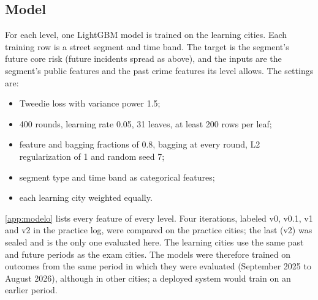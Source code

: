 \documentclass[preprint,12pt,authoryear]{elsarticle}
\begin{document}
\subsection{Model}
For each level, one LightGBM model \citep{ke2017lightgbm} is trained on the learning cities. Each training row is a street segment and time band. The target is the segment's future core risk (future incidents spread as above), and the inputs are the segment's public features and the past crime features its level allows. The settings are:
\begin{itemize}
  \item Tweedie loss with variance power 1.5;
  \item 400 rounds, learning rate 0.05, 31 leaves, at least 200 rows per leaf;
  \item feature and bagging fractions of 0.8, bagging at every round, L2 regularization of 1 and random seed 7;
  \item segment type and time band as categorical features;
  \item each learning city weighted equally.
\end{itemize}
\ref{app:modelo} lists every feature of every level. Four iterations, labeled v0, v0.1, v1 and v2 in the practice log, were compared on the practice cities; the last (v2) was sealed and is the only one evaluated here. The learning cities use the same past and future periods as the exam cities. The models were therefore trained on outcomes from the same period in which they were evaluated (September 2025 to August 2026), although in other cities; a deployed system would train on an earlier period.
\end{document}
